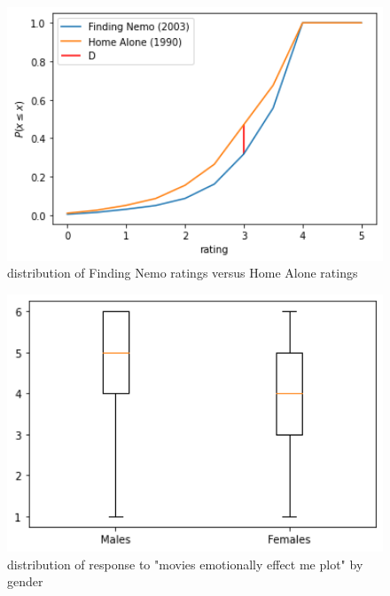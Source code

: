 \documentclass{article}
\begin{document}
\begin{figure}
\label{fig:foo}
\includegraphics[width=15cm]{data analysis project 1/boxplot question 9.png}
\caption{distribution of Finding Nemo ratings versus Home Alone ratings}
\end{figure}


\begin{figure}
\label{fig:foo}
\includegraphics[width=15cm]{data analysis project 1/extracredit boxplot.png}
\caption{distribution of response to "movies emotionally effect me plot" by gender}
\end{figure}
\end{document}
